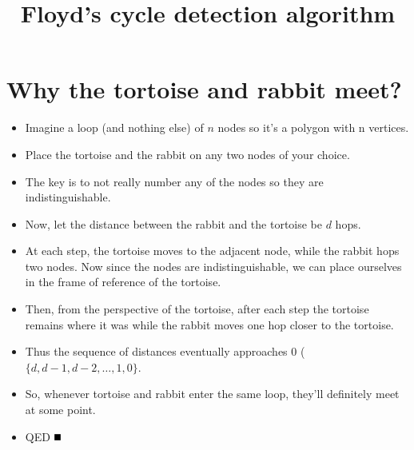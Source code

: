 \documentclass[11pt]{article}
\date{}
\title{Floyd's cycle detection algorithm}
\newcommand{\qed}{\mbox{}\hspace*{\fill}\nolinebreak\mbox{$\rule{0.6em}{0.6em}$}}
\begin{document}
\maketitle
\section{Why the tortoise and rabbit meet?}
\begin{itemize}
    \item Imagine a loop (and nothing else) of \(n\) nodes so it's a polygon with n
vertices.
    \item Place the tortoise and the rabbit on any two nodes of your choice.
    \item The key is to not really number any of the nodes so they are
        indistinguishable.
    \item Now, let the distance between the rabbit and the tortoise be \(d\)
        hops.
    \item At each step, the tortoise moves to the adjacent node, while the
        rabbit hops two nodes. Now since the nodes are indistinguishable, we can
        place ourselves in the frame of reference of the tortoise.
    \item Then, from the perspective of the tortoise, after each step the
        tortoise remains where it was while the rabbit moves one hop closer to
        the tortoise.
    \item Thus the sequence of distances eventually approaches 0 (\(\{d, d-1,
        d-2,\dotsc,1,0\}\).
    \item So, whenever tortoise and rabbit enter the same loop, they'll
        definitely meet at some point.
    \item QED \qed
\end{itemize}
\end{document}
